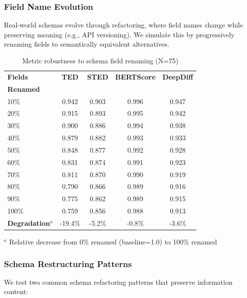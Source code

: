 \documentclass{article}
\begin{document}
\subsubsection{Field Name Evolution}

Real-world schemas evolve through refactoring, where field names change while preserving meaning (e.g., API versioning). We simulate this by progressively renaming fields to semantically equivalent alternatives.

\begin{table}[H]
\centering
\caption{Metric robustness to schema field renaming (N=75)}
\label{tab:field-name-robustness}
\begin{tabular}{lcccc}
\toprule
\textbf{Fields} & \textbf{TED} & \textbf{STED} & \textbf{BERTScore} & \textbf{DeepDiff} \\
\textbf{Renamed} & & & & \\
\midrule
10\% & 0.942 & 0.903 & 0.996 & 0.947 \\
20\% & 0.915 & 0.893 & 0.995 & 0.942 \\
30\% & 0.900 & 0.886 & 0.994 & 0.938 \\
40\% & 0.879 & 0.882 & 0.993 & 0.933 \\
50\% & 0.848 & 0.877 & 0.992 & 0.928 \\
60\% & 0.831 & 0.874 & 0.991 & 0.923 \\
70\% & 0.811 & 0.870 & 0.990 & 0.919 \\
80\% & 0.790 & 0.866 & 0.989 & 0.916 \\
90\% & 0.775 & 0.862 & 0.989 & 0.915 \\
100\% & 0.759 & 0.856 & 0.988 & 0.913 \\
\midrule
\textbf{Degradation}$^a$ & -19.4\% & -5.2\% & -0.8\% & -3.6\% \\
\bottomrule
\end{tabular}
\vspace{-2mm}
\begin{flushleft}
\small $^a$ Relative decrease from 0\% renamed (baseline=1.0) to 100\% renamed
\end{flushleft}
\end{table}

\subsubsection{Schema Restructuring Patterns}

We test two common schema refactoring patterns that preserve information content:
\end{document}
